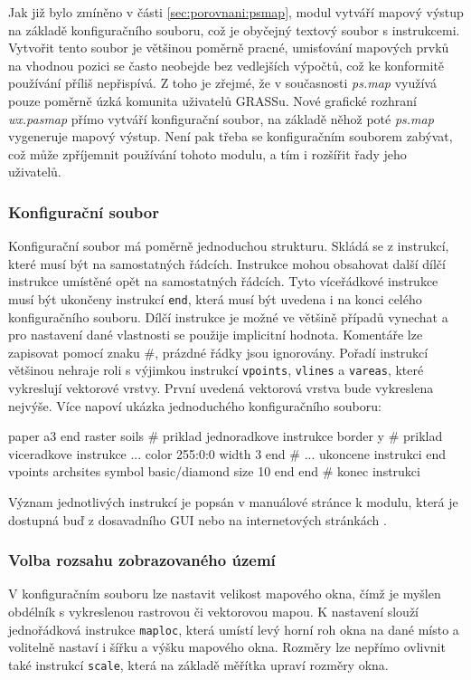 \documentclass[a4paper,12pt,draft]{article}
\newcommand{\modul}[1]{\emph{#1}}
\newcommand{\instr}[1]{\lstinline[style=psmapInline]|#1|}
\begin{document}
Jak již bylo zmíněno v části \ref{sec:porovnani:psmap}, modul vytváří mapový výstup na základě konfiguračního souboru, což je obyčejný textový soubor s instrukcemi. Vytvořit tento soubor je většinou poměrně pracné, umisťování mapových prvků na vhodnou pozici se často neobejde bez vedlejších výpočtů, což ke konformitě používání příliš nepřispívá. Z toho je zřejmé, že v současnosti \modul{ps.map} využívá pouze poměrně úzká komunita uživatelů GRASSu. Nové grafické rozhraní \emph{wx.pasmap} přímo vytváří konfigurační soubor, na základě něhož poté \modul{ps.map} vygeneruje mapový výstup. Není pak třeba se konfiguračním souborem zabývat, což může zpříjemnit používání tohoto modulu, a tím i rozšířit řady jeho uživatelů. 

\subsubsection{Konfigurační soubor}
Konfigurační soubor má poměrně jednoduchou strukturu. Skládá se z instrukcí, které musí být na samostatných řádcích. Instrukce mohou obsahovat další dílčí instrukce umístěné opět na samostatných řádcích. Tyto víceřádkové instrukce musí být ukončeny  instrukcí \instr{end}, která musí být uvedena i na konci celého konfiguračního souboru. Dílčí instrukce je možné ve většině případů vynechat a pro nastavení dané vlastnosti se použije implicitní hodnota. Komentáře lze zapisovat pomocí znaku \#, prázdné řádky jsou ignorovány. Pořadí instrukcí většinou nehraje roli s výjimkou instrukcí \instr{vpoints}, \instr{vlines} a \instr{vareas}, které vykreslují vektorové vrstvy. První uvedená vektorová vrstva bude vykreslena nejvýše. Více napoví ukázka jednoduchého konfiguračního souboru:
\begin{psmap}
paper a3
end
raster soils            # priklad jednoradkove instrukce
border y                # priklad viceradkove instrukce ...
   color 255:0:0
   width 3
end                     # ... ukoncene instrukci end
vpoints archsites
   symbol basic/diamond
   size 10
end
end                     # konec instrukci
\end{psmap}
Význam jednotlivých instrukcí je popsán v manuálové stránce k modulu, která je dostupná buď z dosavadního GUI nebo na internetových stránkách \cite{manual}.

\subsubsection{Volba rozsahu zobrazovaného území}
\label{sec:psmap:rozsah}
V konfiguračním souboru lze nastavit velikost mapového okna, čímž je myšlen obdélník s vykreslenou rastrovou či vektorovou mapou.  K nastavení slouží jednořádková instrukce \instr{maploc}, která umístí levý horní roh okna na dané místo a volitelně nastaví i šířku a výšku mapového okna. Rozměry lze nepřímo ovlivnit také instrukcí \instr{scale}, která na základě měřítka upraví rozměry okna. 
\end{document}
